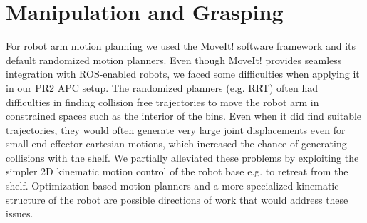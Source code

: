\section{Manipulation and Grasping}
\label{sec:grasping}

For robot arm motion planning we used the MoveIt! software framework and its
default randomized motion planners. Even though MoveIt! provides seamless integration with ROS-enabled robots, we faced some difficulties when applying it in our PR2 APC setup. The randomized planners (e.g. RRT) often had difficulties in finding collision free trajectories
to move the robot arm in constrained spaces such as the interior of the bins. Even when it did find suitable trajectories, they would often  generate very large joint displacements even for small end-effector cartesian motions, which 
increased the chance of generating collisions with the shelf. 
We partially alleviated these
problems by exploiting the simpler 2D kinematic motion control of the robot base e.g.
to retreat from the shelf. Optimization based motion planners and a more specialized
kinematic structure of the robot are possible directions of work that would address
these issues. 

